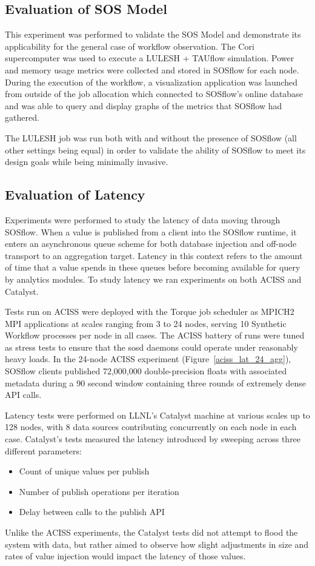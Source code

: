 \subsection{Evaluation of SOS Model} %
This experiment was performed to validate the SOS Model and
demonstrate its applicability for the general case of workflow
observation.
%
The Cori supercomputer was used to execute a LULESH + TAUflow simulation. 
%
Power and memory usage metrics were collected and stored in SOSflow for
each node.
%
During the execution of the workflow, a visualization application was
launched from outside of the job allocation which connected to
SOSflow's online database and was able to query and display graphs of
the metrics that SOSflow had gathered.
%
\par
%
The LULESH job was run both with and without the presence of SOSflow
(all other settings being equal) in order to validate the ability of
SOSflow to meet its design goals while being minimally invasive.
%
%


\subsection{Evaluation of Latency} %
Experiments were performed to study the latency of data moving
through SOSflow.
%
When a value is published from a client into the SOSflow runtime,
it enters an asynchronous queue scheme for both database injection
and off-node transport to an aggregation target.
%
Latency in this context refers to the amount of time that a value
spends in these queues before becoming available for query by
analytics modules.
%
To study latency we ran experiments on both ACISS and Catalyst.
% 
\par
%
Tests run on ACISS were
deployed with the Torque job scheduler as MPICH2 MPI applications at
scales ranging from 3 to 24 nodes, serving 10 Synthetic Workflow processes per node in all cases.
%
The ACISS battery of runs were tuned as stress tests to ensure that
the sosd daemons could operate under reasonably heavy loads.
%
In the 24-node ACISS experiment (Figure~\ref{aciss_lat_24_agg}),
SOSflow clients published 72,000,000 double-precision floats
with associated metadata during a 90 second window containing three
rounds of extremely dense API calls.
%
\par
%
Latency tests were performed on LLNL's Catalyst machine at
various scales up to 128 nodes, with 8 data sources contributing
concurrently on each node in each case.
%
Catalyst's tests measured the latency introduced by sweeping across three
different parameters:
\begin{itemize}
\item Count of unique values per publish
\item Number of publish operations per iteration
\item Delay between calls to the publish API
\end{itemize}
%
Unlike the ACISS experiments, the Catalyst tests did not attempt to
flood the system with data, but rather aimed to observe how slight
adjustments in size and rates of value injection would impact the
latency of those values.
%
%




